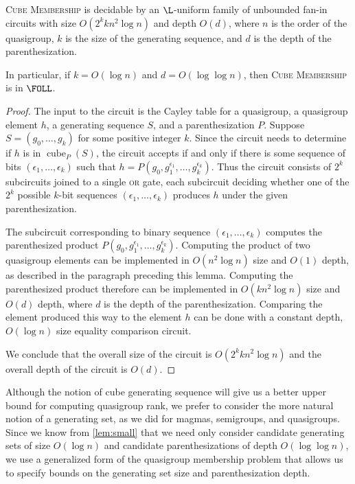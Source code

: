 \documentclass{article}
\DeclareMathOperator{\cube}{cube}
\begin{document}
\begin{lemma}\label{lem:cubemem}
  \textsc{Cube Membership} is decidable by an $\L$-uniform family of unbounded fan-in circuits with size $O(2^k k n^2 \log n)$ and depth $O(d)$, where $n$ is the order of the quasigroup, $k$ is the size of the generating sequence, and $d$ is the depth of the parenthesization.

  In particular, if $k = O(\log n)$ and $d = O(\log \log n)$, then \textsc{Cube Membership} is in $\FOLL$.
\end{lemma}
\begin{proof}
  The input to the circuit is the Cayley table for a quasigroup, a quasigroup element $h$, a generating sequence $S$, and a parenthesization $P$.
  Suppose $S = (g_0, \dotsc, g_k)$ for some positive integer $k$.
  Since the circuit needs to determine if $h$ is in $\cube_P(S)$, the circuit accepts if and only if there is some sequence of bits $(\epsilon_1, \dotsc, \epsilon_k)$ such that $h = P(g_0, g_1^{\epsilon_1}, \dotsc, g_k^{\epsilon_k})$.
  Thus the circuit consists of $2^k$ subcircuits joined to a single \textsc{or} gate, each subcircuit deciding whether one of the $2^k$ possible $k$-bit sequences $(\epsilon_1, \dotsc, \epsilon_k)$ produces $h$ under the given parenthesization.

  The subcircuit corresponding to binary sequence $(\epsilon_1, \dotsc, \epsilon_k)$ computes the parenthesized product $P(g_0, g_1^{\epsilon_1}, \dotsc, g_k^{\epsilon_k})$.
  Computing the product of two quasigroup elements can be implemented in $O(n^2 \log n)$ size and $O(1)$ depth, as described in the paragraph preceding this lemma.
  Computing the parenthesized product therefore can be implemented in $O(k n^2 \log n)$ size and $O(d)$ depth, where $d$ is the depth of the parenthesization.
  Comparing the element produced this way to the element $h$ can be done with a constant depth, $O(\log n)$ size equality comparison circuit.

  We conclude that the overall size of the circuit is $O(2^k k n^2 \log n)$ and the overall depth of the circuit is $O(d)$.
\end{proof}

Although the notion of cube generating sequence will give us a better upper bound for computing quasigroup rank, we prefer to consider the more natural notion of a generating set, as we did for magmas, semigroups, and quasigroups.
Since we know from \autoref{lem:small} that we need only consider candidate generating sets of size $O(\log n)$ and candidate parenthesizations of depth $O(\log \log n)$, we use a generalized form of the quasigroup membership problem that allows us to specify bounds on the generating set size and parenthesization depth.
\end{document}
